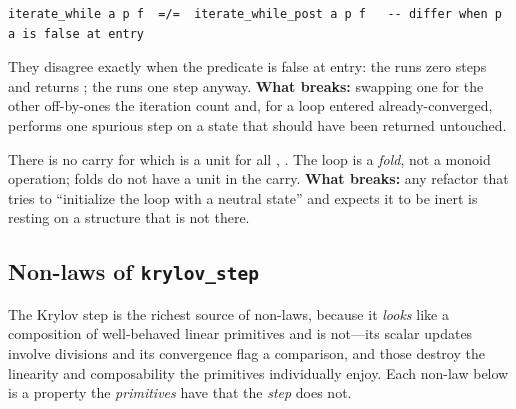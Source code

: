 \begin{description}[style=nextline, leftmargin=0pt, font=\normalfont\itshape]
\begin{lstlisting}[style=l4style]
iterate_while a p f  =/=  iterate_while_post a p f   -- differ when p a is false at entry
  \end{lstlisting}
  They disagree exactly when the predicate is false at entry: the  runs
  zero steps and returns ; the  runs one step anyway.
  \textbf{What breaks:} swapping one for the other off-by-ones the iteration count and,
  for a loop entered already-converged, performs one spurious step on a state that
  should have been returned untouched.
  \item[No identity element.] There is no carry  for which
   is a unit for all , . The loop is a
  \emph{fold}, not a monoid operation; folds do not have a unit in the carry.
  \textbf{What breaks:} any refactor that tries to ``initialize the loop with a
  neutral state'' and expects it to be inert is resting on a structure that is not
  there.
\end{description}

\subsection{Non-laws of \texttt{krylov\_step}}
\label{sec:nlkrylov}

The Krylov step is the richest source of non-laws, because it \emph{looks} like a
composition of well-behaved linear primitives and is not---its scalar updates involve
divisions and its convergence flag a comparison, and those destroy the linearity and
composability the primitives individually enjoy. Each non-law below is a property the
\emph{primitives} have that the \emph{step} does not.

